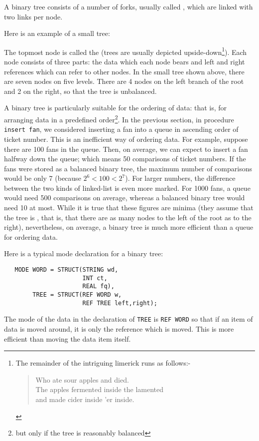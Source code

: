 A binary tree consists of a number of forks, usually called
, which are linked with two links per node.

Here is an example of a small tree:\par
\vfill\goodbreak
\noindent\vbox{}
The topmost node is called the  (trees are
usually depicted upside-down\footnote{The remainder of the intriguing
limerick runs as follows:-
\protect\begin{verse}
Who ate sour apples and died.\protect\\
The apples fermented inside the lamented\protect\\
and made cider inside 'er inside.
\protect\end{verse}}). Each node consists of three parts: the
data which each node bears and left and right references which can
refer to other nodes. In the small tree shown above, there are seven
nodes on five levels. There are 4 nodes on the left branch of the root
and 2 on the right, so that the tree is unbalanced.

A binary tree is particularly suitable for the ordering of data: that
is, for arranging data in a predefined order\footnote{but only if the
tree is reasonably balanced}. In the previous section, in procedure
\verb|insert fan|, we considered inserting a fan into a queue in
ascending order of ticket number. This is an inefficient way of
ordering data. For example, suppose there are 100 fans in the queue.
Then, on average, we can expect to insert a fan halfway down the
queue; which means 50 comparisons of ticket numbers. If the fans were
stored as a balanced binary tree, the maximum number of comparisons
would be only 7 (because $2^6 < 100 < 2^7$). For larger numbers, the
difference between the two kinds of linked-list is even more marked.
For 1000 fans, a queue would need 500 comparisons on average, whereas
a balanced binary tree would need 10 at most. While it is true that
these figures are minima (they assume that the tree is
, that is, that there are as many nodes
to the left of the root as to the right), nevertheless, on average, a
binary tree is much more efficient than a queue for ordering
data.

Here is a typical mode declaration for a binary tree:
\begin{verbatim}
   MODE WORD = STRUCT(STRING wd,
                      INT ct,
                      REAL fq),
        TREE = STRUCT(REF WORD w,
                      REF TREE left,right);
\end{verbatim}
\noindent
The mode of the data in the declaration of \verb|TREE| is \texttt{REF
WORD} so that if an item of data is moved around, it is only the
reference which is moved. This is more efficient than moving the data
item itself.

